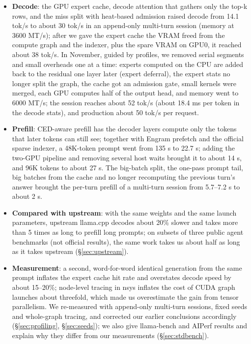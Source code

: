 \documentclass[11pt,a4paper]{article}
\newcommand{\tps}{tok/s}
\begin{document}
\begin{itemize}
  \item \textbf{Decode}: the GPU expert cache, decode attention that gathers only the top-k rows, and the miss split with heat-based admission raised decode from 14.1 \tps{} to about 30 \tps{} in an append-only multi-turn session (memory at 3600 MT/s); after we gave the expert cache the VRAM freed from the compute graph and the indexer, plus the spare VRAM on GPU0, it reached about 38 \tps{}. In November, guided by profiles, we removed serial segments and small overheads one at a time: experts computed on the CPU are added back to the residual one layer later (expert deferral), the expert stats no longer split the graph, the cache got an admission gate, small kernels were merged, each GPU computes half of the output head, and memory went to 6000 MT/s; the session reaches about 52 \tps{} (about 18.4 ms per token in the decode stats), and production about 50 \tps{} per request.
  \item \textbf{Prefill}: CED-aware prefill has the decoder layers compute only the tokens that later tokens can still see; together with Engram prefetch and the official sparse indexer, a 48K-token prompt went from 135 s to 22.7 s; adding the two-GPU pipeline and removing several host waits brought it to about 14 s, and 96K tokens to about 27 s. The big-batch split, the one-pass prompt tail, big batches from the cache and no longer recomputing the previous turn's answer brought the per-turn prefill of a multi-turn session from 5.7--7.2 s to about 2 s.
  \item \textbf{Compared with upstream}: with the same weights and the same launch parameters, upstream llama.cpp decodes about 20\% slower and takes more than 5 times as long to prefill long prompts; on subsets of three public agent benchmarks (not official results), the same work takes us about half as long as it takes upstream (\S\ref{sec:upstream}).
  \item \textbf{Measurement}: a second, word-for-word identical generation from the same prompt inflates the expert cache hit rate and overstates decode speed by about 15--20\%; node-level tracing in nsys inflates the cost of CUDA graph launches about threefold, which made us overestimate the gain from tensor parallelism. We re-measured with append-only multi-turn sessions, fixed seeds and whole-graph tracing, and corrected our earlier conclusions accordingly (\S\ref{sec:profiling}, \S\ref{sec:seeds}); we also give llama-bench and AIPerf results and explain why they differ from our measurements (\S\ref{sec:stdbench}).

\end{itemize}
\end{document}
